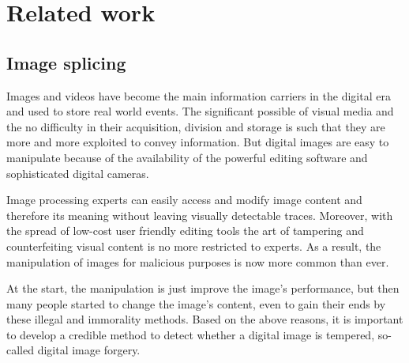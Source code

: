 \chapter{Related work}

\section{Image splicing}



Images and videos have become the main information carriers in the digital era and used to store real world events. The significant possible of visual media and the no difficulty in their acquisition, division and storage is such that they are more and more exploited to convey information. 
But digital images are easy to manipulate because of the availability of the powerful editing software and sophisticated digital cameras. 

Image processing experts can easily access and modify image content and therefore its meaning without leaving visually detectable traces. Moreover, with the spread of low-cost user friendly editing tools the art of tampering and counterfeiting visual content is no more restricted to experts. As a result, the manipulation of images for malicious purposes is now more common than ever. 

At the start, the manipulation is just improve the image's performance, but then many people started to change the image's content, even to gain their ends by these illegal and immorality methods. Based on the above reasons, it is important to develop a credible method to detect whether a digital image is tempered, so-called digital image forgery.

